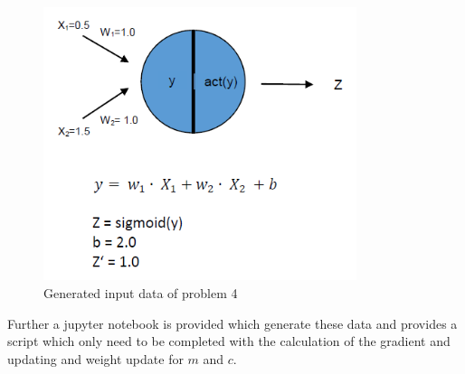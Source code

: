 \begin{figure}[h]
	\centering
	\includegraphics[height=8cm]{img/nn_task2.png}
	\caption{Generated input data of problem 4}
    \label{problem4_imput_data}
\end{figure}

Further a jupyter notebook is provided which generate these data and provides a script which only need to be completed with the calculation of the gradient and updating and weight update for $m$ and $c$.

